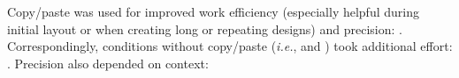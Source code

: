    Copy/paste was used for improved  work efficiency (especially helpful during initial layout or when creating long or repeating designs)
    and precision:
    .
    Correspondingly, conditions without copy/paste (\emph{i.e.}, \lo and \vis) took additional effort:
    .
    Precision also depended on context: %

    




